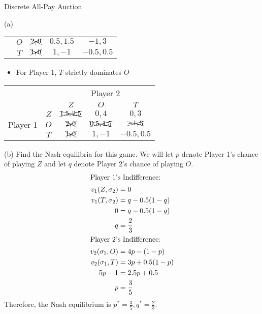 \documentclass[8pt]{extarticle}
\begin{document}
\begin{problem}{Discrete All-Pay Auction}
\begin{problem}{(a)}
\begin{center}
\begin{tabular}{cc|c|c|c|}
          \cline{3-5}
                                      & $O$ & $\xcancel{2,0}$ & $0.5,1.5$ & $-1,3$\\
                                      \cline{3-5}
                                      & $T$ & $\xcancel{1,0}$ & $1,-1$ & $-0.5,0.5$\\
                                      \cline{3-5}
        \end{tabular}
      \end{center}
      \begin{itemize}
        \item For Player 1, $T$ strictly dominates $O$
      \end{itemize}
      \begin{center}
        \renewcommand{\arraystretch}{1.5}
        \begin{tabular}{cc|c|c|c|}
          & \multicolumn{1}{c}{} & \multicolumn{3}{c}{Player 2} \\
          & \multicolumn{1}{c}{} & \multicolumn{1}{c}{$Z$} & \multicolumn{1}{c}{$O$} & \multicolumn{1}{c}{$T$}\\
          \cline{3-5}
          \multirow{3}{2em}{Player 1} & $Z$ & $\xcancel{1.5,2.5}$ & $0,4$ & $0,3$ \\
          \cline{3-5}
                                      & $O$ & $\xcancel{2,0}$ & $\xcancel{0.5,1.5}$ & $\xcancel{-1,3}$\\
                                      \cline{3-5}
                                      & $T$ & $\xcancel{1,0}$ & $1,-1$ & $-0.5,0.5$\\
                                      \cline{3-5}
        \end{tabular}
      \end{center}
    \end{problem}
    \begin{problem}{(b)}
      Find the Nash equilibria for this game.
      \tcblower
      We will let $p$ denote Player 1's chance of playing $Z$ and let $q$ denote Player 2's chance of playing $O$.
      \begin{align*}
        \shortintertext{Player 1's Indifference:}
        v_1(Z,\sigma_2) &= 0\\
        v_1(T,\sigma_2) &= q - 0.5(1-q)\\
        0 &= q - 0.5(1-q) \\
        q &= \frac{2}{3}\\
        \shortintertext{Player 2's Indifference:}
        v_2(\sigma_1,O) &= 4p - (1-p)\\
        v_2(\sigma_1,T) &= 3p + 0.5(1-p)\\
        5p-1 &= 2.5p + 0.5\\
        p &= \frac{3}{5}
      \end{align*}
      Therefore, the Nash equilibrium is $p^* = \frac{3}{5},q^* = \frac{2}{3}$.
    \end{problem}
  \end{problem}
\end{document}
